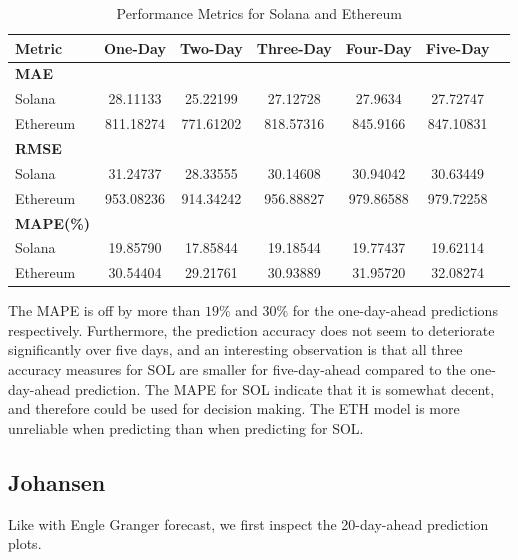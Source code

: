 \begin{table}[H]
\centering
\begin{tabular}{lcccccc}
\toprule
\textbf{Metric} & \textbf{One-Day} & \textbf{Two-Day} & \textbf{Three-Day} & \textbf{Four-Day} & \textbf{Five-Day} \\
\midrule
\textbf{MAE} & & & & & \\
Solana        & 28.11133 & 25.22199 & 27.12728 & 27.9634 & 27.72747 \\
Ethereum      & 811.18274 & 771.61202 & 818.57316 & 845.9166 & 847.10831 \\
\midrule
\textbf{RMSE} & & & & & \\
Solana        & 31.24737 & 28.33555 & 30.14608 & 30.94042 & 30.63449 \\
Ethereum      & 953.08236 & 914.34242 & 956.88827 & 979.86588 & 979.72258 \\
\midrule
\textbf{MAPE(\%)} & & & & & \\
Solana        & 19.85790 & 17.85844 & 19.18544 & 19.77437 & 19.62114 \\
Ethereum      & 30.54404 & 29.21761 & 30.93889 & 31.95720 & 32.08274 \\
\bottomrule
\end{tabular}
\caption{Performance Metrics for Solana and Ethereum}
\label{table:SOL_ETH_MAE_RMSE_MAPE}
\end{table}

\noindent  
The MAPE is off by more than $19\%$ and $30\%$ for the one-day-ahead predictions respectively. Furthermore, the prediction accuracy does not seem to deteriorate significantly over five days, and an interesting observation is that all three accuracy measures for SOL are smaller for five-day-ahead compared to the one-day-ahead prediction. The MAPE for SOL indicate that it is somewhat decent, and therefore could be used for decision making. The ETH model is more unreliable when predicting than when predicting for SOL.
\pause

\subsection{Johansen}
Like with Engle Granger forecast, we first inspect the 20-day-ahead prediction plots. 

